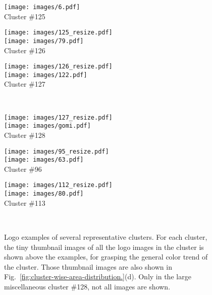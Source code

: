 \documentclass[runningheads]{llncs}
\begin{document}
\begin{figure}[!p]
\begin{center}
\begin{minipage}[b]{0.32\textwidth}
    \texttt{[image: images/6.pdf]}\\[-1mm]
    Cluster \#125
\end{minipage}
\begin{minipage}[b]{0.32\textwidth}
    \centering
    \texttt{[image: images/125\_resize.pdf]}\\
    \texttt{[image: images/79.pdf]}\\[-1mm]
    Cluster \#126
\end{minipage}
\begin{minipage}[b]{0.32\textwidth}
    \centering
    \texttt{[image: images/126\_resize.pdf]}\\
    \texttt{[image: images/122.pdf]}\\[-1mm]
    Cluster \#127
\end{minipage}\medskip \\
\begin{minipage}[b]{0.32\textwidth}
    \centering
    \texttt{[image: images/127\_resize.pdf]}\\
    \texttt{[image: images/gomi.pdf]}\\[-1mm]
    Cluster \#128
\end{minipage}
\begin{minipage}[b]{0.32\textwidth}
    \centering
    \texttt{[image: images/95\_resize.pdf]}\\
    \texttt{[image: images/63.pdf]}\\[-1mm]
    Cluster \#96
\end{minipage}
\begin{minipage}[b]{0.32\textwidth}
    \centering
    \texttt{[image: images/112\_resize.pdf]}\\
    \texttt{[image: images/80.pdf]}\\[-1mm]
    Cluster \#113
\end{minipage}\\
    \caption{Logo examples of several representative clusters. For each cluster, the tiny thumbnail images of all the logo images in the cluster is shown above the examples, for grasping the general color trend of the cluster. Those thumbnail images are also shown in Fig.~\ref{fig:cluster-wise-area-distribution.}(d). Only in the large miscellaneous cluster \#128, not all images are shown.}
    \label{fig:cluter-samples}
\end{center}
\end{figure}
\end{document}
